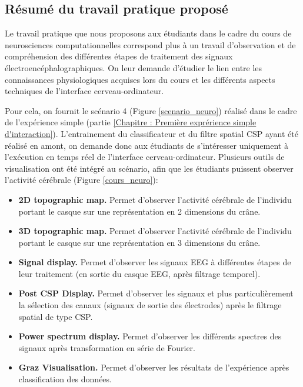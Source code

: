 \subsection{Résumé du travail pratique proposé}

Le travail pratique que nous proposons aux étudiants dans le cadre du cours de neurosciences computationnelles correspond plus à un travail d'observation et de compréhension des différentes étapes de traitement des signaux électroencéphalographiques. On leur demande d'étudier le lien entre les connaissances physiologiques acquises lors du cours et les différents aspects techniques de l'interface cerveau-ordinateur. 

Pour cela, on fournit le scénario 4 (Figure \ref{scenario_neuro}) réalisé dans le cadre de l'expérience simple (partie \ref{Chapitre : Première exprérience simple d'interaction}). L'entrainement du classificateur et du filtre spatial CSP ayant été réalisé en amont, on demande donc aux étudiants de s'intéresser uniquement à l'exécution en temps réel de l'interface cerveau-ordinateur. Plusieurs outils de visualisation ont été intégré au scénario, afin que les étudiants puissent observer l'activité cérébrale (Figure \ref{cours_neuro}): 

\begin{itemize}
	\item \textbf{2D topographic map.} Permet d'observer l'activité cérébrale de l'individu portant le casque sur une représentation en 2 dimensions du crâne.
	\smallbreak
	\item \textbf{3D topographic map.} Permet d'observer l'activité cérébrale de l'individu portant le casque sur une représentation en 3 dimensions du crâne.
	\smallbreak
	\item \textbf{Signal display.} Permet d'observer les signaux EEG à différentes étapes de leur traitement (en sortie du casque EEG, après filtrage temporel).
	\smallbreak
	\item \textbf{Post CSP Display.} Permet d'observer les signaux et plus particulièrement la sélection des canaux (signaux de sortie des électrodes) après le filtrage spatial de type CSP.
	\smallbreak
	\item \textbf{Power spectrum display.} Permet d'observer les différents spectres des signaux après transformation en série de Fourier. 
	\smallbreak
	\item \textbf{Graz Visualisation.} Permet d'observer les résultats de l'expérience après classification des données.
\end{itemize}

